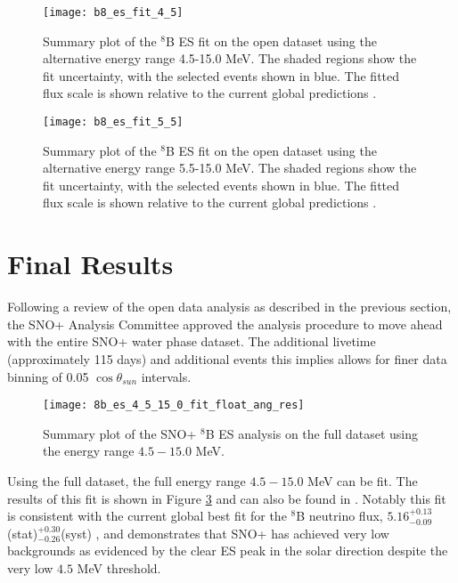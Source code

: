 \begin{figure}
\centering
\texttt{[image: b8\_es\_fit\_4\_5]}
\caption{
Summary plot of the $^8$B ES fit on the open dataset using the alternative energy range 4.5-15.0 MeV.
The shaded regions show the fit uncertainty, with the selected events shown in blue.
The fitted flux scale is shown relative to the current global predictions \cite{GlobalSolarFlux}.
}
\label{fig:solar:open45}
\end{figure}

\begin{figure}
\centering
\texttt{[image: b8\_es\_fit\_5\_5]}
\caption{
Summary plot of the $^8$B ES fit on the open dataset using the alternative energy range 5.5-15.0 MeV.
The shaded regions show the fit uncertainty, with the selected events shown in blue.
The fitted flux scale is shown relative to the current global predictions \cite{GlobalSolarFlux}.
}
\label{fig:solar:open55}
\end{figure}

\clearpage

\section{Final Results}
\label{sec:solar:updated}

Following a review of the open data analysis as described in the previous section, the SNO+ Analysis Committee approved the analysis procedure to move ahead with the entire SNO+ water phase dataset.
The additional livetime (approximately 115 days) and additional events this implies allows for finer data binning of 0.05 $\cos{\theta_{sun}}$ intervals.

\begin{figure}
\centering
\texttt{[image: 8b\_es\_4\_5\_15\_0\_fit\_float\_ang\_res]}
\caption{Summary plot of the SNO+ $^8$B ES analysis on the full dataset using the energy range $4.5-15.0$ MeV.}
\label{fig:solar:unpdated_fit_4.5}
\end{figure}

Using the full dataset, the full energy range $4.5-15.0$ MeV can be fit. 
The results of this fit is shown in Figure \ref{fig:solar:unpdated_fit_4.5} and can also be found in \cite{snoplus_solar}.
Notably this fit is consistent with the current global best fit for the $^8$B neutrino flux, $5.16^{+0.13}_{-0.09}$(stat)$^{+0.30}_{-0.26}$(syst) \cite{GlobalSolarFlux}, and demonstrates that SNO+ has achieved very low backgrounds as evidenced by the clear ES peak in the solar direction despite the very low $4.5$ MeV threshold.
